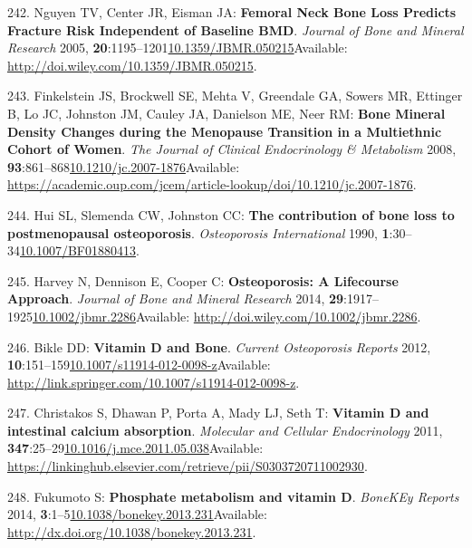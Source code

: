 \documentclass[
]{book}
\begin{document}
\leavevmode\hypertarget{ref-Nguyen2005}{}%
242. Nguyen TV, Center JR, Eisman JA: \textbf{Femoral Neck Bone Loss Predicts Fracture Risk Independent of Baseline BMD}. \emph{Journal of Bone and Mineral Research} 2005, \textbf{20}:1195--1201\href{https://doi.org/10.1359/JBMR.050215}{10.1359/JBMR.050215}Available: \url{http://doi.wiley.com/10.1359/JBMR.050215}.

\leavevmode\hypertarget{ref-Finkelstein2008}{}%
243. Finkelstein JS, Brockwell SE, Mehta V, Greendale GA, Sowers MR, Ettinger B, Lo JC, Johnston JM, Cauley JA, Danielson ME, Neer RM: \textbf{Bone Mineral Density Changes during the Menopause Transition in a Multiethnic Cohort of Women}. \emph{The Journal of Clinical Endocrinology \& Metabolism} 2008, \textbf{93}:861--868\href{https://doi.org/10.1210/jc.2007-1876}{10.1210/jc.2007-1876}Available: \url{https://academic.oup.com/jcem/article-lookup/doi/10.1210/jc.2007-1876}.

\leavevmode\hypertarget{ref-Hui1990}{}%
244. Hui SL, Slemenda CW, Johnston CC: \textbf{The contribution of bone loss to postmenopausal osteoporosis}. \emph{Osteoporosis International} 1990, \textbf{1}:30--34\href{https://doi.org/10.1007/BF01880413}{10.1007/BF01880413}.

\leavevmode\hypertarget{ref-Harvey2014b}{}%
245. Harvey N, Dennison E, Cooper C: \textbf{Osteoporosis: A Lifecourse Approach}. \emph{Journal of Bone and Mineral Research} 2014, \textbf{29}:1917--1925\href{https://doi.org/10.1002/jbmr.2286}{10.1002/jbmr.2286}Available: \url{http://doi.wiley.com/10.1002/jbmr.2286}.

\leavevmode\hypertarget{ref-Bikle2012}{}%
246. Bikle DD: \textbf{Vitamin D and Bone}. \emph{Current Osteoporosis Reports} 2012, \textbf{10}:151--159\href{https://doi.org/10.1007/s11914-012-0098-z}{10.1007/s11914-012-0098-z}Available: \url{http://link.springer.com/10.1007/s11914-012-0098-z}.

\leavevmode\hypertarget{ref-Christakos2011}{}%
247. Christakos S, Dhawan P, Porta A, Mady LJ, Seth T: \textbf{Vitamin D and intestinal calcium absorption}. \emph{Molecular and Cellular Endocrinology} 2011, \textbf{347}:25--29\href{https://doi.org/10.1016/j.mce.2011.05.038}{10.1016/j.mce.2011.05.038}Available: \url{https://linkinghub.elsevier.com/retrieve/pii/S0303720711002930}.

\leavevmode\hypertarget{ref-Fukumoto2014}{}%
248. Fukumoto S: \textbf{Phosphate metabolism and vitamin D}. \emph{BoneKEy Reports} 2014, \textbf{3}:1--5\href{https://doi.org/10.1038/bonekey.2013.231}{10.1038/bonekey.2013.231}Available: \url{http://dx.doi.org/10.1038/bonekey.2013.231}.
\end{document}
